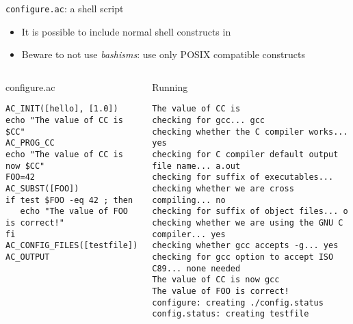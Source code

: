 \begin{frame}[fragile]{{\tt configure.ac}: a shell script}

\begin{itemize}
\item It is possible to include normal shell constructs in
\item Beware to not use {\em bashisms}: use only POSIX compatible
  constructs
\end{itemize}

\begin{columns}

\begin{block}{configure.ac}
{\tiny
\begin{verbatim}
AC_INIT([hello], [1.0])
echo "The value of CC is $CC"
AC_PROG_CC
echo "The value of CC is now $CC"
FOO=42
AC_SUBST([FOO])
if test $FOO -eq 42 ; then
   echo "The value of FOO is correct!"
fi
AC_CONFIG_FILES([testfile])
AC_OUTPUT
\end{verbatim}}
\end{block}


\begin{block}{Running }
\begin{verbatim}
The value of CC is 
checking for gcc... gcc
checking whether the C compiler works... yes
checking for C compiler default output file name... a.out
checking for suffix of executables... 
checking whether we are cross compiling... no
checking for suffix of object files... o
checking whether we are using the GNU C compiler... yes
checking whether gcc accepts -g... yes
checking for gcc option to accept ISO C89... none needed
The value of CC is now gcc
The value of FOO is correct!
configure: creating ./config.status
config.status: creating testfile
\end{verbatim}
\end{block}

\end{columns}

\end{frame}